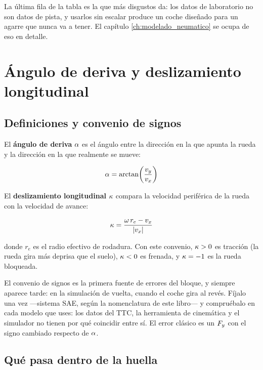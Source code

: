 La última fila de la tabla es la que más disgustos da: los datos de laboratorio
no son datos de pista, y usarlos sin escalar produce un coche diseñado para un
agarre que nunca va a tener. El capítulo \ref{ch:modelado_neumatico} se ocupa de
eso en detalle.

\section{Ángulo de deriva y deslizamiento longitudinal}
\label{sec:neumatico:02}

\subsection{Definiciones y convenio de signos}

El \textbf{ángulo de deriva} $\alpha$ es el ángulo entre la dirección en la que
apunta la rueda y la dirección en la que realmente se mueve:

\begin{equation}
  \alpha = \arctan\!\left(\frac{v_y}{v_x}\right)
  \label{eq:slip_angle}
\end{equation}

El \textbf{deslizamiento longitudinal} $\kappa$ compara la velocidad periférica
de la rueda con la velocidad de avance:

\begin{equation}
  \kappa = \frac{\omega\, r_e - v_x}{|v_x|}
  \label{eq:slip_ratio}
\end{equation}

donde $r_e$ es el radio efectivo de rodadura. Con este convenio, $\kappa > 0$ es
tracción (la rueda gira más deprisa que el suelo), $\kappa < 0$ es frenada, y
$\kappa = -1$ es la rueda bloqueada.

\begin{ojo}
El convenio de signos es la primera fuente de errores del bloque, y siempre
aparece tarde: en la simulación de vuelta, cuando el coche gira al revés.
Fíjalo una vez ---sistema SAE, según la nomenclatura de este libro--- y
compruébalo en cada modelo que uses: los datos del TTC, la herramienta de
cinemática y el simulador no tienen por qué coincidir entre sí. El error clásico
es un $F_y$ con el signo cambiado respecto de $\alpha$.
\end{ojo}

\subsection{Qué pasa dentro de la huella}

